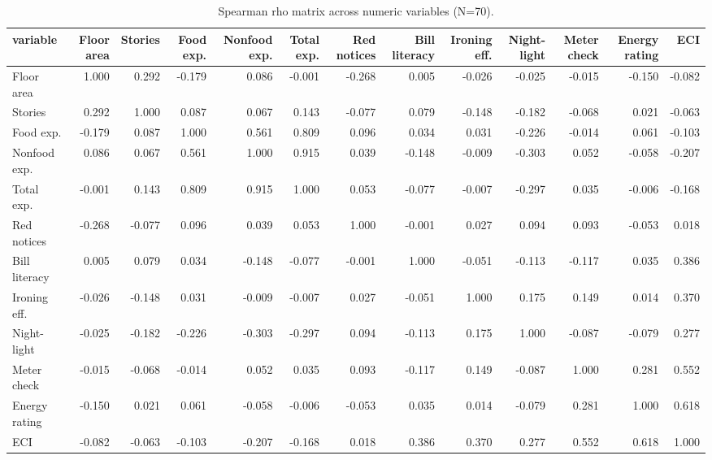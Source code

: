\begin{table}
\caption{Spearman rho matrix across numeric variables (N=70).}
\label{tab:spearman}
\begin{tabular}{lrrrrrrrrrrrr}
\toprule
variable & Floor area & Stories & Food exp. & Nonfood exp. & Total exp. & Red notices & Bill literacy & Ironing eff. & Night-light & Meter check & Energy rating & ECI \\
\midrule
Floor area & 1.000 & 0.292 & -0.179 & 0.086 & -0.001 & -0.268 & 0.005 & -0.026 & -0.025 & -0.015 & -0.150 & -0.082 \\
Stories & 0.292 & 1.000 & 0.087 & 0.067 & 0.143 & -0.077 & 0.079 & -0.148 & -0.182 & -0.068 & 0.021 & -0.063 \\
Food exp. & -0.179 & 0.087 & 1.000 & 0.561 & 0.809 & 0.096 & 0.034 & 0.031 & -0.226 & -0.014 & 0.061 & -0.103 \\
Nonfood exp. & 0.086 & 0.067 & 0.561 & 1.000 & 0.915 & 0.039 & -0.148 & -0.009 & -0.303 & 0.052 & -0.058 & -0.207 \\
Total exp. & -0.001 & 0.143 & 0.809 & 0.915 & 1.000 & 0.053 & -0.077 & -0.007 & -0.297 & 0.035 & -0.006 & -0.168 \\
Red notices & -0.268 & -0.077 & 0.096 & 0.039 & 0.053 & 1.000 & -0.001 & 0.027 & 0.094 & 0.093 & -0.053 & 0.018 \\
Bill literacy & 0.005 & 0.079 & 0.034 & -0.148 & -0.077 & -0.001 & 1.000 & -0.051 & -0.113 & -0.117 & 0.035 & 0.386 \\
Ironing eff. & -0.026 & -0.148 & 0.031 & -0.009 & -0.007 & 0.027 & -0.051 & 1.000 & 0.175 & 0.149 & 0.014 & 0.370 \\
Night-light & -0.025 & -0.182 & -0.226 & -0.303 & -0.297 & 0.094 & -0.113 & 0.175 & 1.000 & -0.087 & -0.079 & 0.277 \\
Meter check & -0.015 & -0.068 & -0.014 & 0.052 & 0.035 & 0.093 & -0.117 & 0.149 & -0.087 & 1.000 & 0.281 & 0.552 \\
Energy rating & -0.150 & 0.021 & 0.061 & -0.058 & -0.006 & -0.053 & 0.035 & 0.014 & -0.079 & 0.281 & 1.000 & 0.618 \\
ECI & -0.082 & -0.063 & -0.103 & -0.207 & -0.168 & 0.018 & 0.386 & 0.370 & 0.277 & 0.552 & 0.618 & 1.000 \\
\bottomrule
\end{tabular}
\end{table}
